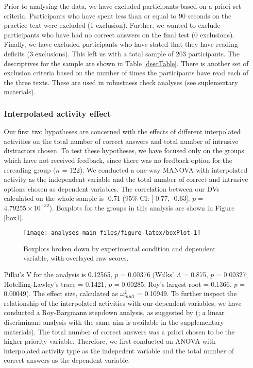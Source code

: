 \documentclass[11pt,]{article}
\begin{document}
Prior to analysing the data, we have excluded participants based on a
priori set criteria. Participants who have spent less than or equal to
90 seconds on the practice text were excluded (1 exclusion). Further, we
wanted to exclude participants who have had no correct answers on the
final test (0 exclusions). Finally, we have excluded participants who
have stated that they have reading deficits (3 exclusions). This left us
with a total sample of 203 participants. The descriptives for the sample
are shown in Table \ref{descTable}. There is another set of exclusion
criteria based on the number of times the participants have read each of
the three texts. These are used in robustness check analyses (see
suplementary materials).

\hypertarget{interpolated-activity-effect}{%
\subsubsection{Interpolated activity
effect}\label{interpolated-activity-effect}}

Our first two hypotheses are concerned with the effects of different
interpolated activities on the total number of correct answers and total
number of intrusive distractors chosen. To test these hypotheses, we
have focused only on the groups which have not received feedback, since
there was no feedback option for the rereading group (\(n\) = 122). We
conducted a one-way MANOVA with interpolated activity as the independent
variable and the total number of correct and intrusive options chosen as
dependent variables. The correlation between our DVs calculated on the
whole sample is -0.71 (95\% CI: {[}-0.77, -0.63{]}, \(p\) =
\(4.79255\times 10^{-32}\)). Boxplots for the groups in this analysis
are shown in Figure \ref{box1}.

\begin{figure*}

{\centering \texttt{[image: analyses-main\_files/figure-latex/boxPlot-1]} 

}

\caption{\label{box1} Boxplots broken down by experimental condition and dependent variable, with overlayed raw scores.}\label{fig:boxPlot}
\end{figure*}

Pillai's V for the analysis is 0.12565, \(p\) = 0.00376 (Wilks'
\(\Lambda\) = 0.875, \(p\) = 0.00327; Hotelling-Lawley's trace = 0.1421,
\(p\) = 0.00285; Roy's largest root = 0.1366, \(p\) = 0.00049). The
effect size, calculated as \(\omega^2_{mult}\) = 0.10949. To further
inspect the relationship of the interpolated activities with our
dependent variables, we have conducted a Roy-Bargmann stepdown analysis,
as suggested by \citeauthor{tabachnick_using_2012}
(\citeyear{tabachnick_using_2012}; a linear discriminant analysis with
the same aim is available in the supplementary materials). The total
number of correct answers was a priori chosen to be the higher priority
variable. Therefore, we first conducted an ANOVA with interpolated
activity type as the indepedent variable and the total number of correct
answers as the dependent variable.
\end{document}
